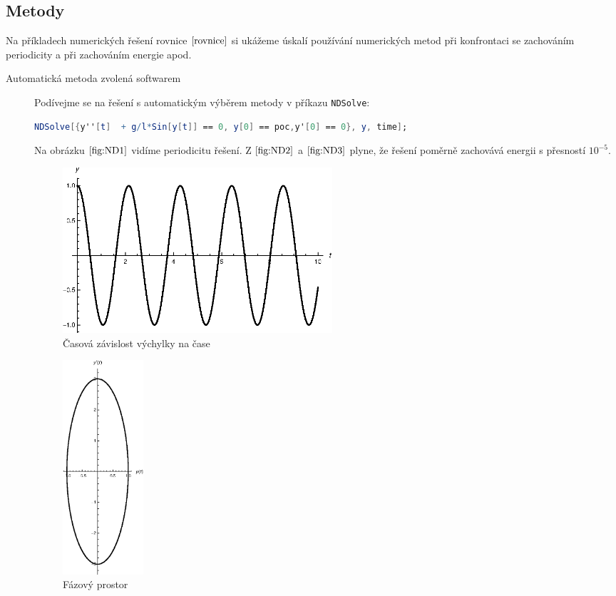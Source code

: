 \subsection{Metody}
\label{sec:Metody}

Na příkladech numerických řešení rovnice $\eqref{rovnice}$ si ukážeme úskalí používání numerických metod při konfrontaci se zachováním periodicity a při zachováním energie apod. 

\begin{description}
\item[Automatická metoda zvolená softwarem] Podívejme se na řešení s automatickým výběrem metody v příkazu \texttt{NDSolve}:

\begin{lstlisting}[language=Mathematica]
NDSolve[{y''[t]  + g/l*Sin[y[t]] == 0, y[0] == poc,y'[0] == 0}, y, time];
\end{lstlisting}

Na obrázku $\eqref{fig:ND1}$ vidíme periodicitu řešení. Z $\eqref{fig:ND2}$ a $\eqref{fig:ND3}$ plyne, že řešení poměrně zachovává energii s přesností $10^{-5}$.

\begin{figure}[h]
  \centering
  \includegraphics[width=10cm]{figures/ND1.eps}
  \caption{Časová závislost výchylky na čase}
  \label{fig:ND1}
\end{figure}

\begin{figure}[h]
  \centering
  \includegraphics[width=3cm]{figures/ND2.eps}
  \caption{Fázový prostor}
  \label{fig:ND2}
\end{figure}


\end{description}
